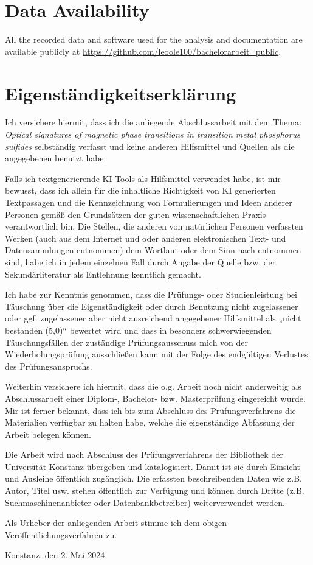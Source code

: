 \documentclass[
	twoside,
	parskip=half,
	a4paper,
]{scrbook}
\begin{document}
\backmatter
\nocite{*}
\printbibliography

\section*{Data Availability}
All the recorded data and software used for the analysis and documentation are available publicly at \url{https://github.com/leoole100/bachelorarbeit_public}.


\clearpage
\thispagestyle{empty}
\section*{Eigenständigkeitserklärung}
Ich versichere hiermit, dass ich die anliegende Abschlussarbeit mit dem Thema:
\textit{Optical signatures of magnetic phase transitions in transition metal phosphorus sulfides}
selbständig verfasst und keine anderen Hilfsmittel und Quellen als die angegebenen benutzt habe.

Falls ich textgenerierende KI-Tools als Hilfsmittel verwendet habe, ist mir bewusst, dass ich allein für
die inhaltliche Richtigkeit von KI generierten Textpassagen und die Kennzeichnung von
Formulierungen und Ideen anderer Personen gemäß den Grundsätzen der guten wissenschaftlichen
Praxis verantwortlich bin. Die Stellen, die anderen von natürlichen Personen verfassten Werken (auch
aus dem Internet und oder anderen elektronischen Text- und Datensammlungen entnommen) dem
Wortlaut oder dem Sinn nach entnommen sind, habe ich in jedem einzelnen Fall durch Angabe der
Quelle bzw. der Sekundärliteratur als Entlehnung kenntlich gemacht.

Ich habe zur Kenntnis genommen, dass die Prüfungs- oder Studienleistung bei Täuschung über die
Eigenständigkeit oder durch Benutzung nicht zugelassener oder ggf. zugelassener aber nicht
ausreichend angegebener Hilfsmittel als „nicht bestanden (5,0)“ bewertet wird und dass in besonders
schwerwiegenden Täuschungsfällen der zuständige Prüfungsausschuss mich von der
Wiederholungsprüfung ausschließen kann mit der Folge des endgültigen Verlustes des
Prüfungsanspruchs.

Weiterhin versichere ich hiermit, dass die o.g. Arbeit noch nicht anderweitig als Abschlussarbeit einer
Diplom-, Bachelor- bzw. Masterprüfung eingereicht wurde. Mir ist ferner bekannt, dass ich bis zum
Abschluss des Prüfungsverfahrens die Materialien verfügbar zu halten habe, welche die
eigenständige Abfassung der Arbeit belegen können.

Die Arbeit wird nach Abschluss des Prüfungsverfahrens der Bibliothek der Universität Konstanz
übergeben und katalogisiert. Damit ist sie durch Einsicht und Ausleihe öffentlich zugänglich. Die
erfassten beschreibenden Daten wie z.B. Autor, Titel usw. stehen öffentlich zur Verfügung und können
durch Dritte (z.B. Suchmaschinenanbieter oder Datenbankbetreiber) weiterverwendet werden.

Als Urheber der anliegenden Arbeit stimme ich dem obigen Veröffentlichungsverfahren zu.

Konstanz, den 2. Mai 2024
\end{document}

